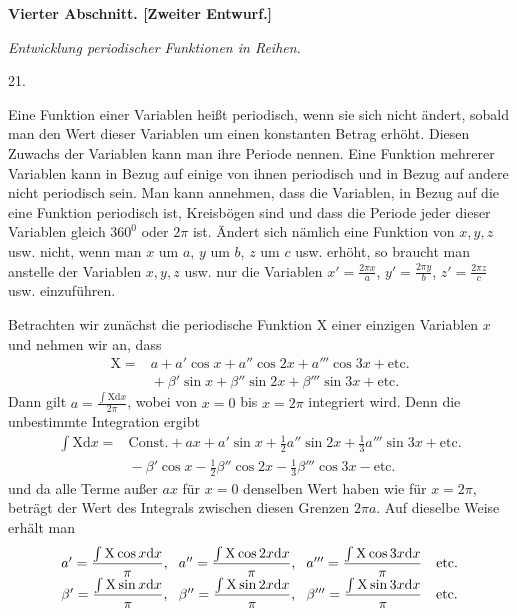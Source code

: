 \par{}\bigskip
{}
\begin{center}{\large\bfseries Vierter Abschnitt. [Zweiter Entwurf.]\par}\medskip
\textit{Entwicklung periodischer Funktionen in Reihen.}\end{center}
\begin{center}21.\end{center}
\begingroup
\noindent\hspace*{\parindent}Eine Funktion einer Variablen heißt periodisch, wenn sie sich nicht ändert, sobald man den Wert dieser Variablen um einen konstanten Betrag erhöht. Diesen Zuwachs der Variablen kann man ihre Periode nennen. Eine Funktion mehrerer Variablen kann in Bezug auf einige von ihnen periodisch und in Bezug auf andere nicht periodisch sein. Man kann annehmen, dass die Variablen, in Bezug auf die eine Funktion periodisch ist, Kreisbögen sind und dass die Periode jeder dieser Variablen gleich \(360^0\) oder \(2\pi\) ist. Ändert sich nämlich eine Funktion von \(x,y,z\) usw. nicht, wenn man \(x\) um \(a\), \(y\) um \(b\), \(z\) um \(c\) usw. erhöht, so braucht man anstelle der Variablen \(x,y,z\) usw. nur die Variablen \(x'=\frac{2\pi x}{a}\), \(y'=\frac{2\pi y}{b}\), \(z'=\frac{2\pi z}{c}\) usw. einzuführen.
\par
Betrachten wir zunächst die periodische Funktion \(\mathrm{X}\) einer einzigen Variablen \(x\) und nehmen wir an, dass
\[
\begin{aligned}
\mathrm{X}={}&a+a'\cos x+a''\cos2x+a'''\cos3x+\text{etc.}\\
&{}+\beta'\sin x+\beta''\sin2x+\beta'''\sin3x+\text{etc.}
\end{aligned}
\]
\noindent{}Dann gilt \(a=\frac{\int\mathrm{X}\mathrm{d}x}{2\pi}\), wobei von \(x=0\) bis \(x=2\pi\) integriert wird. Denn die unbestimmte Integration ergibt
\[
\begin{aligned}
\int\mathrm{X}\mathrm{d}x={}&\text{Const.}+ax+a'\sin x+\tfrac12a''\sin2x+\tfrac13a'''\sin3x+\text{etc.}\\
&{}-\beta'\cos x-\tfrac12\beta''\cos2x-\tfrac13\beta'''\cos3x-\text{etc.}
\end{aligned}
\]
\noindent und da alle Terme außer \(ax\) für \(x=0\) denselben Wert haben wie für \(x=2\pi\), beträgt der Wert des Integrals zwischen diesen Grenzen \(2\pi a\). Auf dieselbe Weise erhält man
\[
\setlength{\arraycolsep}{4pt}
\begin{array}{lll}
a'=\dfrac{\int\mathrm{X}\cos x\mathrm{d}x}{\pi},&a''=\dfrac{\int\mathrm{X}\cos2x\mathrm{d}x}{\pi},&a'''=\dfrac{\int\mathrm{X}\cos3x\mathrm{d}x}{\pi}\quad\text{etc.}\\[4pt]
\beta'=\dfrac{\int\mathrm{X}\sin x\mathrm{d}x}{\pi},&\beta''=\dfrac{\int\mathrm{X}\sin2x\mathrm{d}x}{\pi},&\beta'''=\dfrac{\int\mathrm{X}\sin3x\mathrm{d}x}{\pi}\quad\text{etc.}
\end{array}
\]
\par\endgroup
